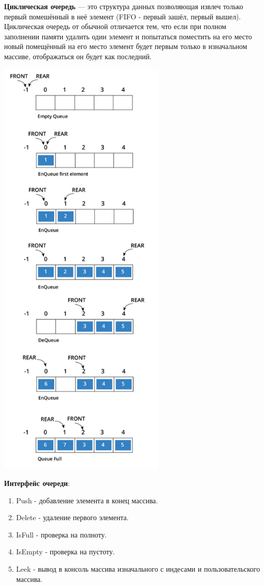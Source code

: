 \documentclass[14pt]{article}
\begin{document}
	\newpage
	\textbf{Циклическая очередь} --- это структура данных позволяющая извлеч только первый помешённый в неё элемент (FIFO - первый зашёл, первый вышел). Циклическая очередь от обычной отличается тем, что если при полном заполнении памяти удалить один элемент и попытаться поместить на его место новый помещённый на его место элемент будет первым только в изначальном массиве, отображаться он будет как последний.
	\begin{center}
		\includegraphics[width = 0.6\textwidth, height = 0.75\textheight]{Turn}
		\label{fig:label2}
	\end{center}
	\newpage
	\textbf{Интерфейс очереди}:
	\begin{enumerate}
		\item Push - добавление элемента в конец массива.
		\item Delete - удаление первого элемента.
		\item IsFull - проверка на полноту.
		\item IsEmpty - проверка на пустоту.
		\item Leek - вывод в консоль массива изначального с индесами и пользовательского массива.
	\end{enumerate}
	
\end{document}
